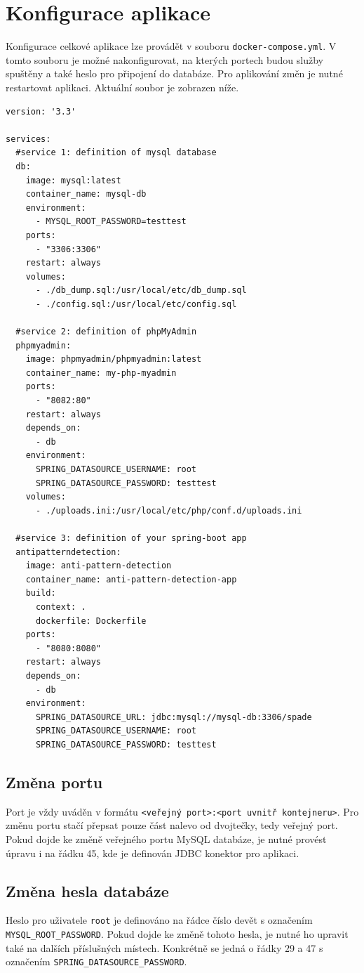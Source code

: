 \documentclass[czech,DP]{thesiskiv}
\begin{document}
\section{Konfigurace aplikace}
Konfigurace celkové aplikace lze provádět v souboru \texttt{docker-compose.yml}. V tomto souboru je možné nakonfigurovat, na kterých portech budou služby spuštěny a také heslo pro připojení do databáze. Pro aplikování změn je nutné restartovat aplikaci. Aktuální soubor je zobrazen níže.
\newline
\begin{lstlisting}
version: '3.3'

services:
  #service 1: definition of mysql database
  db:
    image: mysql:latest
    container_name: mysql-db
    environment:
      - MYSQL_ROOT_PASSWORD=testtest
    ports:
      - "3306:3306"
    restart: always
    volumes:
      - ./db_dump.sql:/usr/local/etc/db_dump.sql
      - ./config.sql:/usr/local/etc/config.sql

  #service 2: definition of phpMyAdmin
  phpmyadmin:
    image: phpmyadmin/phpmyadmin:latest
    container_name: my-php-myadmin
    ports:
      - "8082:80"
    restart: always
    depends_on:
      - db
    environment:
      SPRING_DATASOURCE_USERNAME: root
      SPRING_DATASOURCE_PASSWORD: testtest
    volumes:
      - ./uploads.ini:/usr/local/etc/php/conf.d/uploads.ini

  #service 3: definition of your spring-boot app
  antipatterndetection:
    image: anti-pattern-detection
    container_name: anti-pattern-detection-app
    build:
      context: .
      dockerfile: Dockerfile
    ports:
      - "8080:8080"                 
    restart: always
    depends_on:
      - db
    environment:
      SPRING_DATASOURCE_URL: jdbc:mysql://mysql-db:3306/spade
      SPRING_DATASOURCE_USERNAME: root
      SPRING_DATASOURCE_PASSWORD: testtest

\end{lstlisting}
\subsection{Změna portu}
Port je vždy uváděn v formátu \texttt{<veřejný port>:<port uvnitř kontejneru>}. Pro změnu portu stačí přepsat pouze část nalevo od dvojtečky, tedy veřejný port. Pokud dojde ke změně veřejného portu MySQL databáze, je nutné provést úpravu i na řádku 45, kde je definován JDBC konektor pro aplikaci.
\subsection{Změna hesla databáze}
Heslo pro uživatele \texttt{root} je definováno na řádce číslo devět s označením \texttt{MYSQL\_ROOT\_PASSWORD}. Pokud dojde ke změně tohoto hesla, je nutné ho upravit také na dalších příslušných místech. Konkrétně se jedná o řádky 29 a 47 s označením \texttt{SPRING\_DATASOURCE\_PASSWORD}.
\end{document}
